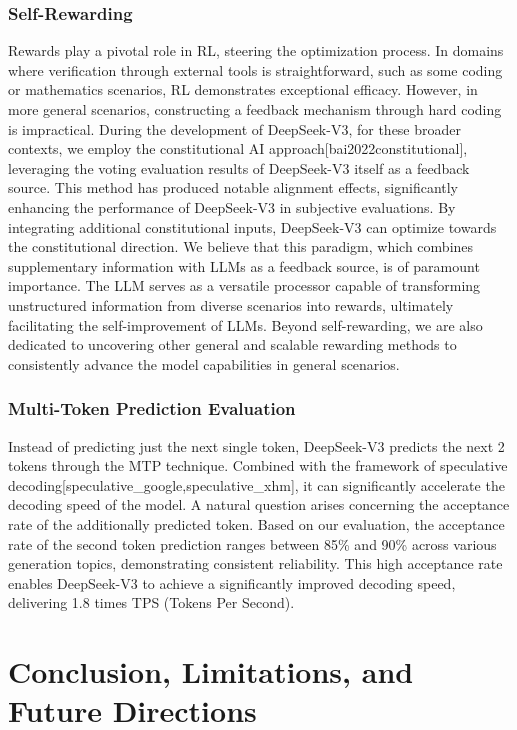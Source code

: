 \documentclass[11pt,a4paper]{article}
\begin{document}
\subsubsection{Self-Rewarding}

Rewards play a pivotal role in RL, steering the optimization process. In domains where verification through external tools is straightforward, such as some coding or mathematics scenarios, RL demonstrates exceptional efficacy. However, in more general scenarios, constructing a feedback mechanism through hard coding is impractical. During the development of DeepSeek-V3, for these broader contexts, we employ the constitutional AI approach[bai2022constitutional], leveraging the voting evaluation results of DeepSeek-V3 itself as a feedback source. This method has produced notable alignment effects, significantly enhancing the performance of DeepSeek-V3 in subjective evaluations. By integrating additional constitutional inputs, DeepSeek-V3 can optimize towards the constitutional direction. We believe that this paradigm, which combines supplementary information with LLMs as a feedback source, is of paramount importance. The LLM serves as a versatile processor capable of transforming unstructured information from diverse scenarios into rewards, ultimately facilitating the self-improvement of LLMs. Beyond self-rewarding, we are also dedicated to uncovering other general and scalable rewarding methods to consistently advance the model capabilities in general scenarios.

\subsubsection{Multi-Token Prediction Evaluation}

Instead of predicting just the next single token, DeepSeek-V3 predicts the next 2 tokens through the MTP technique. Combined with the framework of speculative decoding[speculative\_google,speculative\_xhm], it can significantly accelerate the decoding speed of the model. A natural question arises concerning the acceptance rate of the additionally predicted token. Based on our evaluation, the acceptance rate of the second token prediction ranges between 85\% and 90\% across various generation topics, demonstrating consistent reliability. This high acceptance rate enables DeepSeek-V3 to achieve a significantly improved decoding speed, delivering 1.8 times TPS (Tokens Per Second).

\section{Conclusion, Limitations, and Future Directions}
\end{document}
